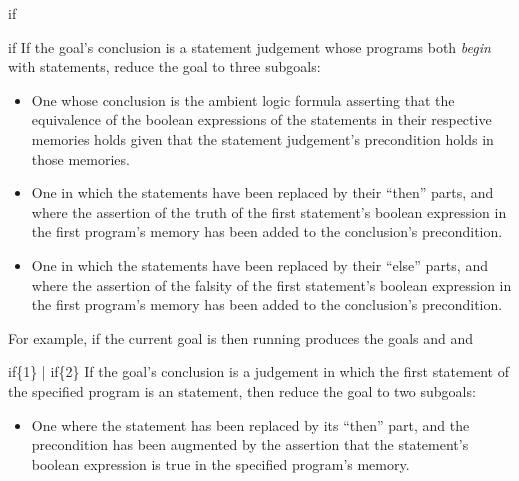 \begin{tactic}{if}
  \begin{tsyntax}{if}
  If the goal's conclusion is a \prhl statement judgement whose programs
  both \emph{begin} with  statements, reduce the goal to
  three subgoals:
  \begin{itemize}
  \item One whose conclusion is the ambient logic formula asserting that
    the equivalence of the boolean expressions of the  statements
    in their respective memories holds given that the statement judgement's
    precondition holds in those memories.

  \item One in which the  statements have been replaced by
    their ``then'' parts, and where the assertion of the truth of
    the first  statement's boolean expression in the first
    program's memory has been added to the conclusion's precondition.

  \item One in which the  statements have been replaced by
    their ``else'' parts, and where the assertion of the falsity of
    the first  statement's boolean expression in the first
    program's memory has been added to the conclusion's precondition.
  \end{itemize}

  \bigskip
  For example, if the current goal is
   then
  running 
  produces the goals
  and
  and
  \end{tsyntax}

  \begin{tsyntax}{if\{1\} | if\{2\}}
    If the goal's conclusion is a \prhl judgement in which the first
    statement of the specified program is an  statement,
    then reduce the goal to two subgoals:
    \begin{itemize}
    \item One where the  statement has been replaced by its
      ``then'' part, and the precondition has been augmented by the
      assertion that the  statement's boolean expression is true
      in the specified program's memory.


\end{itemize}
\end{tsyntax}
\end{tactic}
